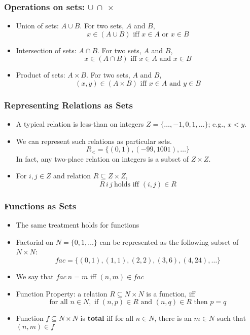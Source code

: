\documentclass{beamer}
\begin{document}
\frame
{
    \frametitle{Operations on sets: $\cup~ \cap~ \times$}

    
\begin{itemize}
\item Union of sets: $A \cup B$. For two sets, $A$ and $B$, 
\[
x \in (A \cup B) \mbox{ iff } x \in A \mbox{ or } x \in B
\]
\pause
\item Intersection of sets: $A \cap B$. For two sets, $A$ and $B$, 
\[
x \in (A \cap B) \mbox{ iff } x \in A \mbox{ and } x \in B
\]
\pause
\item Product of sets: $A \times B$. For two sets, $A$ and $B$, 
\[
(x,y) \in (A \times B) \mbox{ iff } x \in A \mbox{ and } y \in B
\]
\pause
\end{itemize}

}

\frame
{
    \frametitle{Representing Relations as Sets}
    
\begin{itemize}
\item A typical relation is less-than on integers $Z = \{\ldots,-1,0,1,\ldots\}$; e.g., $x < y$.
\pause

\item We can represent such relations as particular sets. 
\[
R_< = \{ (0,1), (-99,1001), \ldots \}
\]
In fact, any two-place relation on integers is a subset of $Z \times Z$.
\pause

\item For $i,j \in Z$ and relation $R \subseteq Z \times Z$, 
\[
 R \,i \,j ~\mbox{holds} \mbox{ iff } (i,j) \in R
\]
\end{itemize}

}

\frame
{
    \frametitle{Functions as Sets}
    
\begin{itemize}
\item The same treatment holds for functions
\pause

\item Factorial on $N = \{0,1,\ldots\}$ can be represented as the following subset of $N \times N$:
\[
fac = \{ (0,1), (1,1), (2,2), (3,6), (4,24), \ldots \}
\]
\pause

\item We say that $fac~ n = m$ iff $(n,m) \in fac$
\pause

\item Function Property: a relation $R \subseteq N \times N$ is a function, iff
\[
\mbox{for all }n \in N, \mbox{ if } (n,p) \in R \mbox{ and } (n,q) \in R \mbox{ then } p=q
\]
\pause 

\item Function $f \subseteq N \times N$ is {\bf total} iff for all $n\in N$, there is an $m\in N$ such that $(n,m) \in f$

\end{itemize}


}
\end{document}
